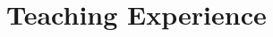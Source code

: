 \documentclass[letterpaper]{article}
\begin{document}

\section*{Teaching Experience}
\end{document}
